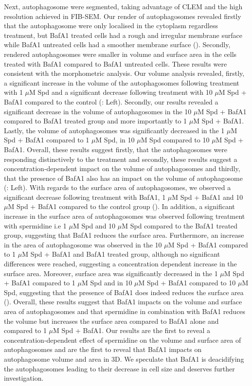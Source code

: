 Next, autophagosome were segmented, taking advantage of CLEM and the high resolution achieved in FIB-SEM. Our render of autophagosomes revealed firstly that the autophagosome were only localised in the cytoplasm regardless treatment, but BafA1 treated cells had a rough and irregular membrane surface while BafA1 untreated cells had a smoother membrane surface (). Secondly, rendered autophagosomes were smaller in volume and surface area in the cells treated with BafA1 compared to BafA1 untreated cells. These results were consistent with the morphometric analysis. Our volume analysis revealed, firstly, a significant increase in the volume of the autophagosomes following treatment with 1 $\mu$M Spd and a significant decrease following treatment with 10 $\mu$M Spd + BafA1 compared to the control (: Left). Secondly, our results revealed a significant decrease in the volume of autophagosomes in the 10 $\mu$M Spd + BafA1 compared to BafA1 treated group and more importantly to 1 $\mu$M Spd + BafA1.  Lastly, the volume of autophagosomes was significantly decreased in the 1 $\mu$M Spd + BafA1 compared to 1 $\mu$M Spd, in 10 $\mu$M Spd  compared to 10 $\mu$M Spd + BafA1. Overall, these results suggest firstly, that the autophagosomes were responding distinctively to the treatment and secondly, these results suggest a concentration-dependent impact on the volume of autophagosomes and thirdly, that the presence of BafA1 also has an  impact on the volume of autophagosome (: Left). With regards to the surface area of autophagosomes, we observed a significant decrease following  treatment with BafA1, 1 $\mu$M Spd + BafA1  and 10 $\mu$M Spd + BafA1 compared to the control group (). In addition, a significant increase in the surface area of autophagosomes was observed following treatment with spermidine i.e 1 $\mu$M Spd  and 10 $\mu$M Spd compared to the BafA1 treated group, suggesting that BafA1 reduces the surface area. Furthermore, an increase in the area of autophagosome was observed in the 10 $\mu$M Spd + BafA1 compared to 1 $\mu$M Spd + BafA1 and BafA1 treated group, although no significant differences were reached, suggesting a concentration dependent increase in the surface area. Moreover, surface area was significantly decreased in the 1 $\mu$M Spd + BafA1 compared to 1 $\mu$M Spd and in 10 $\mu$M Spd + BafA1 compared to 10 $\mu$M Spd, suggesting that the presence of BafA1 does indeed reduces the surface area (). Overall, these results suggest that BafA1 impacts on the volume and surface area of autophagosomes and that spermidine in combination with BafA1 reduces the volume but increases the surface area compared to BafA1 alone and compared to 1 $\mu$M Spd + BafA1. Our results are the first to reveal a concentration-dependent effect of spermidine on the volume and surface area of autophagosomes and are the first to reveal that BafA1 impacts on autophagosome volume and area in 3D. We speculate that BafA1 is deacidifying the autophagosomes leading to their decrease in cell size and deserves further investigation.


